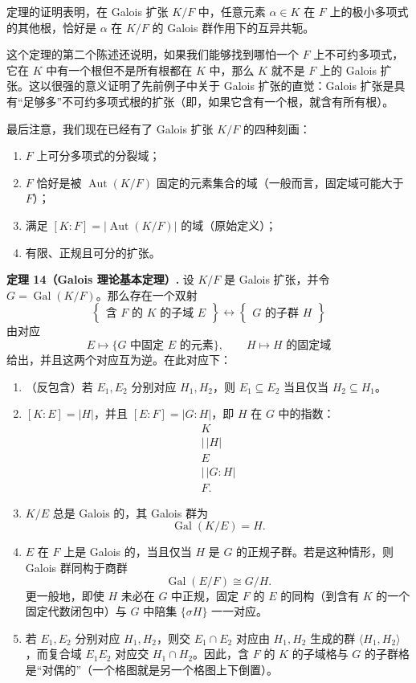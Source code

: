 定理的证明表明，在 Galois 扩张 $K/F$ 中，任意元素 $\alpha\in K$ 在 $F$ 上的极小多项式的其他根，恰好是 $\alpha$ 在 $K/F$ 的 Galois 群作用下的互异共轭。

这个定理的第二个陈述还说明，如果我们能够找到哪怕一个 $F$ 上不可约多项式，它在 $K$ 中有一个根但不是所有根都在 $K$ 中，那么 $K$ 就不是 $F$ 上的 Galois 扩张。这以很强的意义证明了先前例子中关于 Galois 扩张的直觉：Galois 扩张是具有“足够多”不可约多项式根的扩张（即，如果它含有一个根，就含有所有根）。

最后注意，我们现在已经有了 Galois 扩张 $K/F$ 的四种刻画：
\begin{enumerate}[label=(\arabic*)]
\item $F$ 上可分多项式的分裂域；
\item $F$ 恰好是被 $\operatorname{Aut}(K/F)$ 固定的元素集合的域（一般而言，固定域可能大于 $F$）；
\item 满足 $[K:F]=|\operatorname{Aut}(K/F)|$ 的域（原始定义）；
\item 有限、正规且可分的扩张。
\end{enumerate}

\noindent\textbf{定理 14（Galois 理论基本定理）.} 设 $K/F$ 是 Galois 扩张，并令 $G=\operatorname{Gal}(K/F)$。那么存在一个双射
\[
\left\{\begin{array}{c}
\text{含 }F\text{ 的 }K\text{ 的}\text{子域 }E
\end{array}\right\}
\longleftrightarrow
\left\{\begin{array}{c}
G\text{ 的}\text{子群 }H
\end{array}\right\}
\]
由对应
\[
E\longmapsto \{G\text{ 中固定 }E\text{ 的元素}\},
\qquad
H\longmapsto H\text{ 的固定域}
\]
给出，并且这两个对应互为逆。在此对应下：
\begin{enumerate}[label=(\arabic*)]
\item （反包含）若 $E_1,E_2$ 分别对应 $H_1,H_2$，则 $E_1\subseteq E_2$ 当且仅当 $H_2\subseteq H_1$。
\item $[K:E]=|H|$，并且 $[E:F]=|G:H|$，即 $H$ 在 $G$ 中的指数：
\[
\begin{array}{c}
K\\[-2mm]
|\,|H|\\[-1mm]
E\\[-2mm]
|\,|G:H|\\[-1mm]
F.
\end{array}
\]
\item $K/E$ 总是 Galois 的，其 Galois 群为
\[
\operatorname{Gal}(K/E)=H.
\]
\item $E$ 在 $F$ 上是 Galois 的，当且仅当 $H$ 是 $G$ 的正规子群。若是这种情形，则 Galois 群同构于商群
\[
\operatorname{Gal}(E/F)\cong G/H.
\]
更一般地，即使 $H$ 未必在 $G$ 中正规，固定 $F$ 的 $E$ 的同构（到含有 $K$ 的一个固定代数闭包中）与 $G$ 中陪集 $\{\sigma H\}$ 一一对应。
\item 若 $E_1,E_2$ 分别对应 $H_1,H_2$，则交 $E_1\cap E_2$ 对应由 $H_1,H_2$ 生成的群 $\langle H_1,H_2\rangle$，而复合域 $E_1E_2$ 对应交 $H_1\cap H_2$。因此，含 $F$ 的 $K$ 的子域格与 $G$ 的子群格是“对偶的”（一个格图就是另一个格图上下倒置）。
\end{enumerate}

